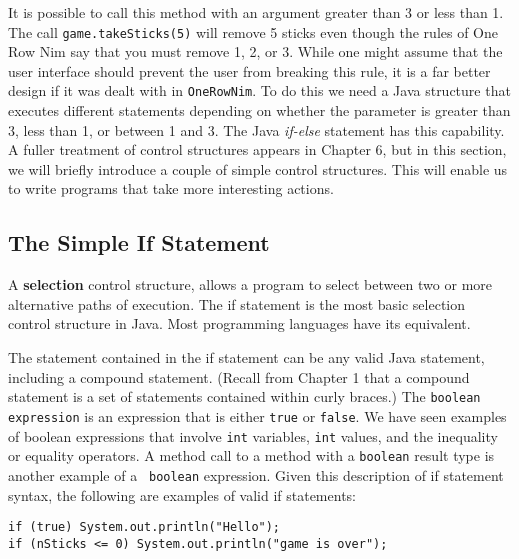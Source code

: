 \noindent It is possible to call this method with an argument greater
than 3 or less than 1.  The call {\tt game.takeSticks(5)} will remove
5 sticks even though the rules of One Row Nim say that you must remove
1, 2, or 3.  While one might assume that the user interface should
prevent the user from breaking this rule, it is a far better design if
it was dealt with in {\tt OneRowNim}.  To do this we need a Java
structure that executes different statements depending on whether the
parameter is greater than 3, less than 1, or between 1 and 3.  The
Java {\it if-else} statement has this capability.  A fuller treatment
of control structures appears in Chapter 6, but in this section, we
will briefly introduce a couple of simple control structures. This will
enable us to write programs that take more interesting actions.

\subsection{The Simple If Statement}
\label{sec-if}

\noindent A {\bf selection} control structure, allows a program 
to select between two or more alternative paths of execution. The if
statement is the most basic selection control
structure in Java. Most programming languages have its equivalent.


\noindent The statement contained in the if statement can be
any valid Java statement, including a compound statement. (Recall from
Chapter 1 that a compound statement is a set of statements contained
within curly braces.)  The {\tt boolean expression} is an expression
that is either {\tt true} or {\tt false}. We have seen examples of
boolean expressions that involve {\tt int} variables, {\tt int}
values, and the inequality or equality operators.  A method call to a
method with a {\tt boolean} result type is another example of a {\tt
boolean} expression.  Given this description of if statement syntax,
the following are examples of valid if statements:

\begin{jjjlisting}
\begin{lstlisting}
if (true) System.out.println("Hello");
if (nSticks <= 0) System.out.println("game is over");
\end{lstlisting}
\end{jjjlisting}

